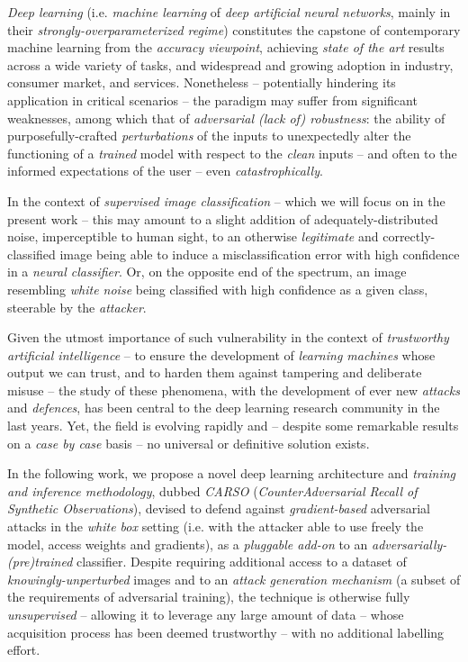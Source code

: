 

\textit{Deep learning} (i.e. \textit{machine learning} of \textit{deep artificial neural networks}, mainly in their \textit{strongly-overparameterized regime}) constitutes the capstone of contemporary machine learning from the \textit{accuracy viewpoint}, achieving \textit{state of the art}  results across a wide variety of tasks, and widespread and growing adoption in industry, consumer market, and services. Nonetheless – potentially hindering its application in critical scenarios – the paradigm may suffer from significant weaknesses, among which that of \textit{adversarial (lack of) robustness}: the ability of purposefully-crafted \textit{perturbations} of the inputs to unexpectedly alter the functioning of a \textit{trained} model with respect to the \textit{clean} inputs – and often to the informed expectations of the user – even \textit{catastrophically}.

In the context of \textit{supervised image classification} – which we will focus on in the present work – this may amount to a slight addition of adequately-distributed noise, imperceptible to human sight, to an otherwise \textit{legitimate} and correctly-classified image being able to induce a misclassification error with high confidence in a \textit{neural classifier}. Or, on the opposite end of the spectrum, an image resembling \textit{white noise} being classified with high confidence as a given class, steerable by the \textit{attacker}.

Given the utmost importance of such vulnerability in the context of \textit{trustworthy artificial intelligence} – to ensure the development of \textit{learning machines} whose output we can trust, and to harden them against tampering and deliberate misuse – the study of these phenomena, with the development of ever new \textit{attacks} and \textit{defences}, has been central to the deep learning research community in the last years. Yet, the field is evolving rapidly and – despite some remarkable results on a \textit{case by case} basis – no universal or definitive solution exists.

In the following work, we propose a novel deep learning architecture and \textit{training and inference methodology}, dubbed \textit{CARSO} (\textit{CounterAdversarial Recall of Synthetic Observations}), devised to defend against \textit{gradient-based} adversarial attacks in the \textit{white box} setting (i.e. with the attacker able to use freely the model, access weights and gradients), as a \textit{pluggable add-on} to an \textit{adversarially-(pre)trained} classifier. Despite requiring additional access to a dataset of \textit{knowingly-unperturbed} images and to an \textit{attack generation mechanism} (a subset of the requirements of adversarial training), the technique is otherwise fully \textit{unsupervised} – allowing it to leverage any large amount of data – whose acquisition process has been deemed trustworthy – with no additional labelling effort.

